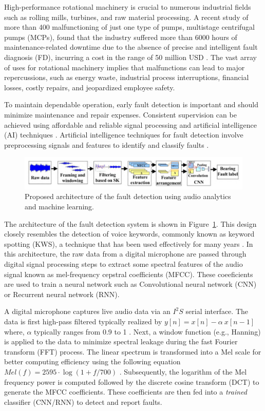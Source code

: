 \documentclass[12pt]{article}
\begin{document}
High-performance rotational machinery is crucial to numerous industrial fields such as rolling mills, turbines, and raw material processing.
A recent study of more than 400 malfunctioning of just one type of pumps, multistage centrifugal pumps (MCPs), found that the industry suffered more than 6000 hours of maintenance-related downtime due to the absence of precise and intelligent fault diagnosis (FD), incurring a cost in the range of 50 million USD \cite{rane2021re}.
The vast array of uses for rotational machinery implies that malfunctions can lead to major repercussions, such as energy waste, industrial process interruptions, financial losses, costly repairs, and jeopardized employee safety. 

To maintain dependable operation, early fault detection is important and should minimize maintenance and repair expenses. Consistent supervision can be achieved using affordable and reliable signal processing and artificial intelligence (AI) techniques \cite{sunal2022review}. Artificial intelligence techniques for fault detection involve preprocessing signals and features to identify and classify faults \cite{saeed2021fault, jiang2019bearing}.

\begin{figure}[htb]
\centering
\includegraphics[width=0.9\linewidth]{figs/fig-arch1.png}
\caption{\label{fig:arch1}Proposed architecture of the fault detection using audio analytics and machine learning.}
\end{figure}

The architecture of the fault detection system is shown in Figure~\ref{fig:arch1}. This design closely resembles the detection of voice keywords, commonly known as keyword spotting (KWS), a technique that has been used effectively for many years \cite{chong20220}.
In this architecture, the raw data from a digital microphone are passed through digital signal processing steps to extract some spectral features of the audio signal known as mel-frequency cepstral coefficients (MFCC). These coeeficients are used to train a neural network such as Convolutional neural network (CNN) or Recurrent neural network (RNN). 

A digital microphone captures live audio data via an $I^2S$ serial interface. The data is first high-pass filtered typically realized by $y[n] = x[n] - \alpha~x[n-1]$ where, $\alpha$ typically ranges from 0.9 to 1 \cite{han2006efficient}.
Next, a window function (e.g., Hanning) is applied to the data to minimize spectral leakage during the fast Fourier transform (FFT) process. The linear spectrum is transformed into a Mel scale for better computing efficiency using the following equation $Mel(f) = 2595\cdot \log(1 + f/700)$ \cite{han2006efficient}.
Subsequently, the logarithm of the Mel frequency power is computed followed by the discrete cosine transform (DCT) to generate the MFCC coefficients. These coefficients are then fed into a \textit{trained} classifier (CNN/RNN) to detect and report faults.
\end{document}
